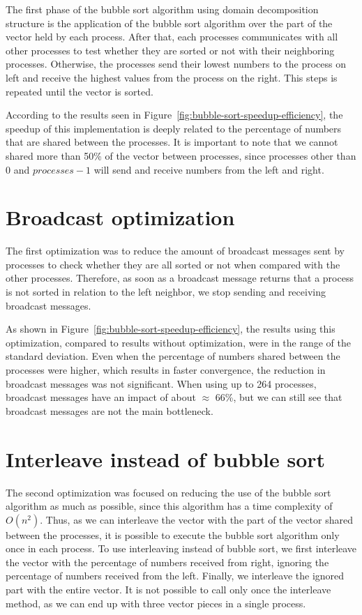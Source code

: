 \documentclass[10pt,twocolumn]{article}
\begin{document}
The first phase of the bubble sort algorithm using domain decomposition structure is the application of the bubble sort algorithm over the part of the vector held by each process. After that, each processes communicates with all other processes to test whether they are sorted or not with their neighboring processes. Otherwise, the processes send their lowest numbers to the process on left and receive the highest values from the process on the right. This steps is repeated until the vector is sorted.

According to the results seen in Figure~\ref{fig:bubble-sort-speedup-efficiency}, the speedup of this implementation is deeply related to the percentage of numbers that are shared between the processes. It is important to note that we cannot shared more than 50\% of the vector between processes, since processes other than $0$ and $processes - 1$ will send and receive numbers from the left and right.


\section*{Broadcast optimization}

The first optimization was to reduce the amount of broadcast messages sent by processes to check whether they are all sorted or not when compared with the other processes. Therefore, as soon as a broadcast message returns that a process is not sorted in relation to the left neighbor, we stop sending and receiving broadcast messages.

As shown in Figure~\ref{fig:bubble-sort-speedup-efficiency}, the results using this optimization, compared to results without optimization, were in the range of the standard deviation. Even when the percentage of numbers shared between the processes were higher, which results in faster convergence, the reduction in broadcast messages was not significant. When using up to 264 processes, broadcast messages have an impact of about $\approx$ 66\%, but we can still see that broadcast messages are not the main bottleneck.


\section*{Interleave instead of bubble sort}

The second optimization was focused on reducing the use of the bubble sort algorithm as much as possible, since this algorithm has a time complexity of $O(n^2)$. Thus, as we can interleave the vector with the part of the vector shared between the processes, it is possible to execute the bubble sort algorithm only once in each process. To use interleaving instead of bubble sort, we first interleave the vector with the percentage of numbers received from right, ignoring the percentage of numbers received from the left. Finally, we interleave the ignored part with the entire vector. It is not possible to call only once the interleave method, as we can end up with three vector pieces in a single process.
\end{document}
